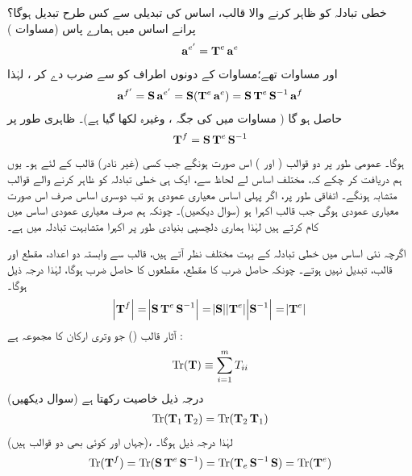 خطی تبادلہ  کو ظاہر کرنے والا قالب،  اساس کی تبدیلی سے کس طرح تبدیل ہوگا؟ پرانے اساس میں ہمارے پاس   (مساوات )
\begin{align*}
	\operatorname{\mathbf{a}}^{e'} = \operatorname{\mathbf{T}}^e\operatorname{\mathbf{a}}^e
\end{align*}
اور مساوات   تھے؛مساوات    کے   دونوں اطراف کو  سے ضرب دے کر     ،  لہٰذا   
\begin{align*}
	\operatorname{\mathbf{a}}^{f'} = \operatorname{\mathbf{S}}\operatorname{\mathbf{a}}^{e'} = \operatorname{\mathbf{S}}(\operatorname{\mathbf{T}}^e\operatorname{\mathbf{a}}^e) = \operatorname{\mathbf{S}}\operatorname{\mathbf{T}}^e\operatorname{\mathbf{S}}^{-1}\operatorname{\mathbf{a}}^f
\end{align*}
حاصل  ہو گا ( مساوات   میں  کی جگہ ، وغیرہ لکھا گیا ہے)۔ ظاہری طور پر
\begin{align}
	\operatorname{\mathbf{T}}^f = \operatorname{\mathbf{S}}\operatorname{\mathbf{T}}^e\operatorname{\mathbf{S}}^{-1}
\end{align}
ہوگا۔ عمومی طور پر دو قوالب (  اور ) اس صورت    ہونگے جب کسی (غیر نادر)  قالب  کے لئے   ہو۔ یوں ہم دریافت کر چکے کہ،  مختلف اساس لے لحاظ سے،  ایک ہی خطی تبادلہ کو ظاہر کرنے والے قوالب متشابہ ہونگے۔ اتفاقی طور پر،  اگر پہلی اساس معیاری عمودی ہو تب دوسری اساس صرف اس صورت  معیاری عمودی ہوگی  جب قالب  اکہرا ہو  (سوال  دیکھیں)۔ چونکہ ہم صرف معیاری عمودی اساس میں کام کرتے ہیں لہٰذا ہماری دلچسپی بنیادی طور پر  اکہرا  متشابہت  تبادلہ میں ہے۔

اگرچہ نئی اساس میں  خطی تبادلہ کے   بہت مختلف نظر آتے ہیں،  قالب سے وابستہ دو اعداد،  مقطع اور   قالب،  تبدیل نہیں ہوتے۔ چونکہ حاصل ضرب کا مقطع،  مقطعوں  کا حاصل ضرب ہوگا،  لہٰذا درجہ ذیل ہوگا۔
\begin{align}
	\abs{\operatorname{\mathbf{T}}^f} = \abs{\operatorname{\mathbf{S}}\operatorname{\mathbf{T}}^e\operatorname{\mathbf{S}}^{-1}} = \abs{\operatorname{\mathbf{S}}}\abs{\operatorname{\mathbf{T}}^e}\abs{\operatorname{\mathbf{S}}^{-1}} = \abs{\operatorname{\mathbf{T}}^e}
\end{align}
 آثار قالب  () جو وتری ارکان کا مجموعہ ہے :
\begin{align}
	\operatorname{Tr}(\operatorname{\mathbf{T}})\equiv\sum_{i=1}^{m}T_{ii}
\end{align}
درجہ ذیل خاصیت رکھتا ہے  (سوال   دیکھیں)
\begin{align}
	\operatorname{Tr}(\operatorname{\mathbf{T}}_1\operatorname{\mathbf{T}}_2) = \operatorname{Tr}(\operatorname{\mathbf{T}}_2\operatorname{\mathbf{T}}_1)
\end{align}
 (جہاں  اور  کوئی بھی دو قوالب ہیں)،   لہٰذا درجہ ذیل ہوگا۔
\begin{align}
	\operatorname{Tr}(\operatorname{\mathbf{T}}^f) = \operatorname{Tr}(\operatorname{\mathbf{S}}\operatorname{\mathbf{T}}^e\operatorname{\mathbf{S}}^{-1}) = \operatorname{Tr}(\operatorname{\mathbf{T}}_e\operatorname{\mathbf{S}}^{-1}\operatorname{\mathbf{S}}) = \operatorname{Tr}(\operatorname{\mathbf{T}}^e)
\end{align}


